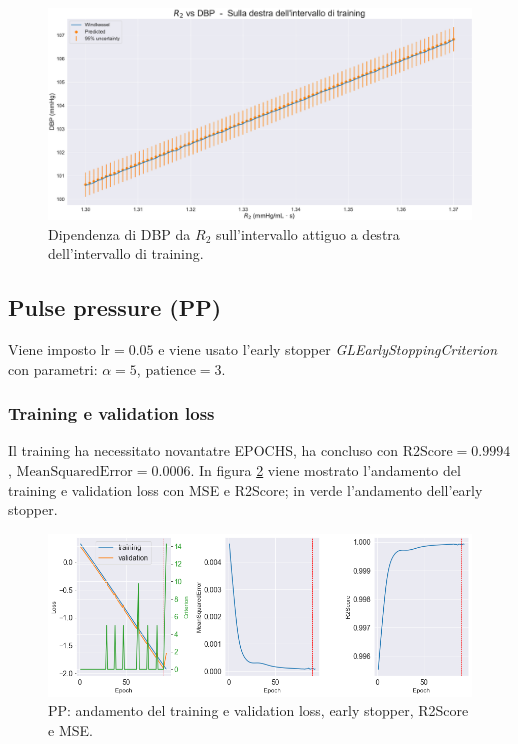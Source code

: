 \begin{figure}
    \centering
    \includegraphics[width=1\textwidth]{images/Training (risultati)/DBP/DBP - R2 - dx.pdf}
    \caption{Dipendenza di DBP da $R_2$ sull'intervallo attiguo a destra dell'intervallo di training.}
    \label{DBP - R2 - dx}
\end{figure}







\newpage
\subsection{Pulse pressure (PP)}
Viene imposto $\text{lr}=0.05$ e viene usato l'early stopper \textit{GLEarlyStoppingCriterion} con parametri: $\alpha = 5$, $\text{patience}=3$.


\subsubsection{Training e validation loss}
Il training ha necessitato novantatre EPOCHS, ha concluso con $\text{R2Score}=0.9994$, $\text{MeanSquaredError}=0.0006$. In figura \ref{PP - loss} viene mostrato l'andamento del training e validation loss con MSE e R2Score; in verde l'andamento dell'early stopper.
\begin{figure}[h]
    \centering
    \includegraphics[width=1\textwidth]{images/Training (risultati)/PP/PP - loss.png}
    \caption{PP: andamento del training e validation loss, early stopper, R2Score e MSE.}
    \label{PP - loss}
\end{figure}

